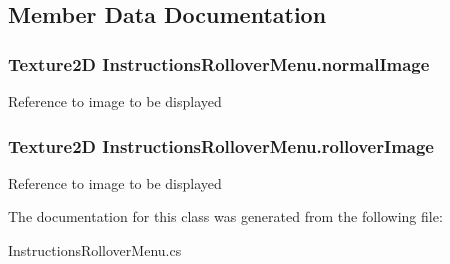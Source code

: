 \subsection{Member Data Documentation}
\hypertarget{class_instructions_rollover_menu_abc4315ea253fbea4491da43647f1aae2}{
\subsubsection[{normal\-Image}]{\setlength{\rightskip}{0pt plus 5cm}Texture2\-D Instructions\-Rollover\-Menu.\-normal\-Image}}\label{class_instructions_rollover_menu_abc4315ea253fbea4491da43647f1aae2}
Reference to image to be displayed \hypertarget{class_instructions_rollover_menu_a858d6b4b9e15fcb415a51561845618ef}{
\subsubsection[{rollover\-Image}]{\setlength{\rightskip}{0pt plus 5cm}Texture2\-D Instructions\-Rollover\-Menu.\-rollover\-Image}}\label{class_instructions_rollover_menu_a858d6b4b9e15fcb415a51561845618ef}
Reference to image to be displayed 

The documentation for this class was generated from the following file\-:\begin{DoxyCompactItemize}
\item 
Instructions\-Rollover\-Menu.\-cs\end{DoxyCompactItemize}
